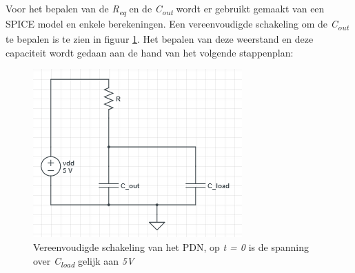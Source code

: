 \documentclass{article}
\begin{document}
\newcommand{\tss}{\textsubscript}
\newcommand{\tsss}{\textsuperscript}

Voor het bepalen van de \emph{R\tss{eq}} en de \emph{C\tss{out}} wordt er gebruikt gemaakt van een SPICE model en enkele berekeningen. Een vereenvoudigde schakeling om de \emph{C\tss{out}} te bepalen is te zien in figuur \ref{res:PDN_schematic}. Het bepalen van deze weerstand en deze capaciteit wordt gedaan aan de hand van het volgende stappenplan:

 \begin{figure} [h!]
 \begin{center}
 \includegraphics [scale = 0.5] {figures/PDN_schematic}
 \caption{Vereenvoudigde schakeling van het PDN, op \emph{t = 0} is de spanning over \emph{C\tss{load}} gelijk aan \emph{5V}}
 \label{res:PDN_schematic}
 \end{center}
 \end{figure}
\end{document}
